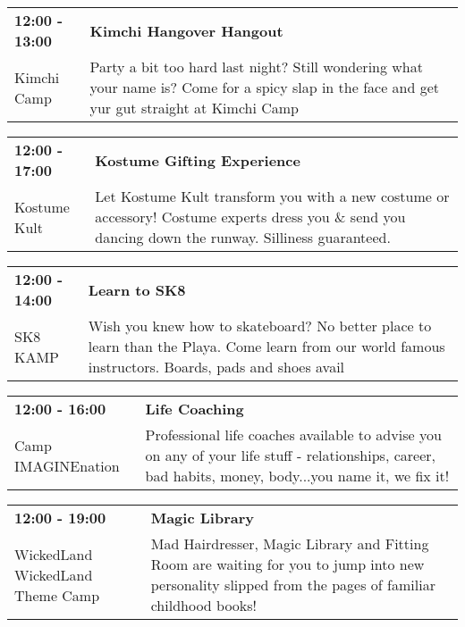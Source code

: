 \begin{tabular}{ p{1in} p{2.2in} }
    \textbf{12:00 - 13:00} & \textbf{Kimchi Hangover Hangout} \\
    Kimchi Camp \newline  & Party a bit too hard last night? Still wondering what your name is? Come for a spicy slap in the face and get yur gut straight at Kimchi Camp \\
    \hline 
\end{tabular}
    
\begin{tabular}{ p{1in} p{2.2in} }
    \textbf{12:00 - 17:00} & \textbf{Kostume Gifting Experience} \\
    Kostume Kult \newline  & Let Kostume Kult transform you with a new costume or accessory! Costume experts dress you \& send you dancing down the runway. Silliness guaranteed. \\
    \hline 
\end{tabular}
    
\begin{tabular}{ p{1in} p{2.2in} }
    \textbf{12:00 - 14:00} & \textbf{Learn to SK8} \\
    SK8 KAMP \newline  & Wish you knew how to skateboard? No better place to learn than the Playa. Come learn from our world famous instructors.  Boards, pads and shoes avail \\
    \hline 
\end{tabular}
    
\begin{tabular}{ p{1in} p{2.2in} }
    \textbf{12:00 - 16:00} & \textbf{Life Coaching} \\
    Camp IMAGINEnation \newline  & Professional life coaches available to advise you on any of your life stuff - relationships, career, bad habits, money, body...you name it, we fix it! \\
    \hline 
\end{tabular}
    
\begin{tabular}{ p{1in} p{2.2in} }
    \textbf{12:00 - 19:00} & \textbf{Magic Library} \\
    WickedLand \newline WickedLand Theme Camp & Mad Hairdresser, Magic Library and Fitting Room are waiting for you to jump into new personality slipped from the pages of familiar childhood books! \\
    \hline 
\end{tabular}
    

